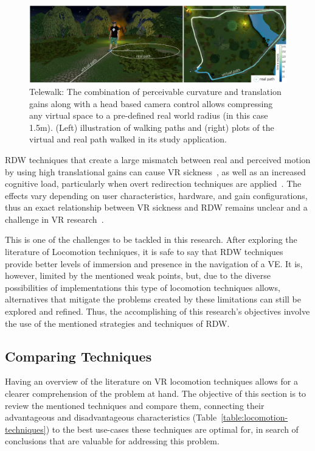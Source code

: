 \begin{figure}[b]
    \centering
    \includegraphics[width=\textwidth]{NOVAthesisFiles/Images/papers/rdw-telewalk.png}
    \caption[Illustration of Telewalk]{Telewalk: The combination of perceivable curvature and translation gains along with a head based camera
    control allows compressing any virtual space to a pre-defined real world radius (in this case 1.5m). (Left) illustration of walking paths
    and (right) plots of the virtual and real path walked in its study application.~\cite{Rietzler2020}}
    \label{fig:rdw-telewalk}
\end{figure}

\gls{RDW} techniques that create a large mismatch between real and perceived motion by using high translational gains 
can cause \gls{VR} sickness~\cite{Gemert2024}, as well as an increased cognitive load, particularly when overt redirection techniques 
are applied~\cite{8255772}. The effects vary depending on user characteristics, hardware, and gain configurations, thus 
an exact relationship between \gls{VR} sickness and \gls{RDW} remains unclear and a challenge in \gls{VR} research~\cite{Gemert2024, Grechkin2016}.

This is one of the challenges to be tackled in this research. After exploring the literature of Locomotion techniques, 
it is safe to say that \gls{RDW} techniques provide better levels of immersion and presence in the navigation of a \gls{VE}. It is, however, 
limited by the mentioned weak points, but, due to the diverse possibilities of implementations this type of locomotion techniques allows, 
alternatives that mitigate the problems created by these limitations can still be explored and refined. Thus, the accomplishing of this 
research's objectives involve the use of the mentioned strategies and techniques of \gls{RDW}.


\subsection{Comparing Techniques}
\label{sec:loc-summary}

Having an overview of the literature on \gls{VR} locomotion techniques allows for a clearer comprehension of the problem at hand. The objective of this section 
is to review the mentioned techniques and compare them, connecting their advantageous and disadvantageous characteristics (Table~\ref{table:locomotion-techniques})
to the best use-cases these techniques are optimal for, in search of conclusions that are valuable for addressing this problem.

